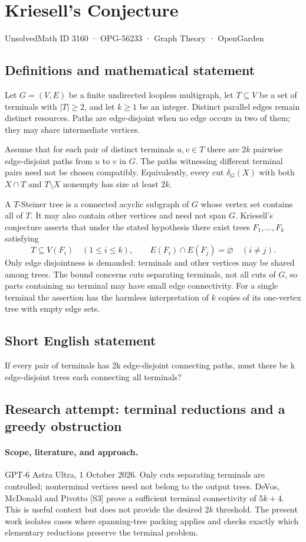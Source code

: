 \documentclass[11pt,a4paper]{article}
\begin{document}
\section*{Kriesell's Conjecture}\label{3160}
{\small UnsolvedMath ID 3160 · OPG-56233 · Graph Theory · OpenGarden}
\subsection{Definitions and mathematical statement}
Let $G=(V,E)$ be a finite undirected loopless multigraph, let
$T\subseteq V$ be a set of terminals with $|T|\geq2$, and let
$k\geq1$ be an integer. Distinct parallel edges remain distinct
resources. Paths are edge-disjoint when no edge occurs in two
of them; they may share intermediate vertices.

Assume that for each pair of distinct terminals $u,v\in T$
there are $2k$ pairwise edge-disjoint paths from $u$ to $v$ in
$G$. The paths witnessing different terminal pairs need not be
chosen compatibly. Equivalently, every cut $\delta_G(X)$ with
both $X\cap T$ and $T\setminus X$ nonempty has size at least
$2k$.

A $T$-Steiner tree is a connected acyclic subgraph of $G$ whose
vertex set contains all of $T$. It may also contain other
vertices and need not span $G$. Kriesell's conjecture asserts
that under the stated hypothesis there exist trees
$F_1,\ldots,F_k$ satisfying
\[
 T\subseteq V(F_i)\quad(1\leq i\leq k),\qquad
 E(F_i)\cap E(F_j)=\varnothing\quad(i\neq j).
\]
Only edge disjointness is demanded: terminals and other vertices
may be shared among trees. The bound concerns cuts separating
terminals, not all cuts of $G$, so parts containing no terminal
may have small edge connectivity. For a single terminal the
assertion has the harmless interpretation of $k$ copies of its
one-vertex tree with empty edge sets.
\subsection{Short English statement}
If every pair of terminals has 2k edge-disjoint connecting paths, must there be k edge-disjoint trees each connecting all terminals?
\subsection{Research attempt: terminal reductions and a greedy obstruction}
\paragraph{Scope, literature, and approach.}
GPT-6 Astra Ultra, 1 October 2026. Only cuts separating terminals are
controlled; nonterminal vertices need not belong to the output trees.
DeVos, McDonald and Pivotto [S3] prove a sufficient terminal connectivity
of $5k+4$. This is useful context but does not provide the desired
$2k$ threshold. The present work isolates cases where spanning-tree
packing applies and checks exactly which elementary reductions preserve
the terminal problem.
\end{document}
